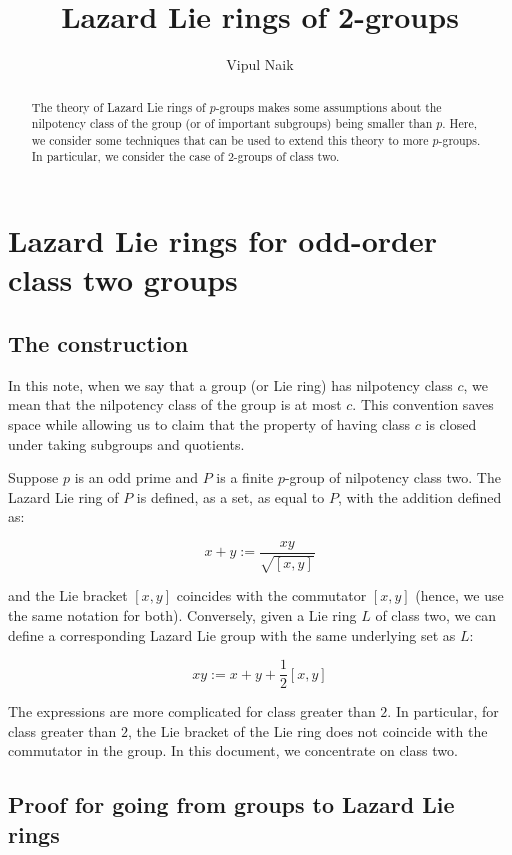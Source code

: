 \documentclass[10pt]{amsart}
\title{Lazard Lie rings of 2-groups}
\author{Vipul Naik}
\begin{document}
\maketitle

\begin{abstract}
  The theory of Lazard Lie rings of $p$-groups makes some assumptions
  about the nilpotency class of the group (or of important subgroups)
  being smaller than $p$. Here, we consider some techniques that can
  be used to extend this theory to more $p$-groups. In particular, we
  consider the case of $2$-groups of class two.
\end{abstract}

\section{Lazard Lie rings for odd-order class two groups}

\subsection{The construction}

In this note, when we say that a group (or Lie ring) has nilpotency
class $c$, we mean that the nilpotency class of the group is at most
$c$. This convention saves space while allowing us to claim that the
property of having class $c$ is closed under taking subgroups and
quotients.

Suppose $p$ is an odd prime and $P$ is a finite $p$-group of
nilpotency class two. The Lazard Lie ring of $P$ is defined, as a set,
as equal to $P$, with the addition defined as:

$$x + y := \frac{xy}{\sqrt{[x,y]}}$$

and the Lie bracket $[x,y]$ coincides with the commutator $[x,y]$
(hence, we use the same notation for both). Conversely, given a Lie
ring $L$ of class two, we can define a corresponding Lazard Lie group
with the same underlying set as $L$:

$$xy := x + y + \frac{1}{2}[x,y]$$

The expressions are more complicated for class greater than $2$. In
particular, for class greater than $2$, the Lie bracket of the Lie
ring does not coincide with the commutator in the group. In this
document, we concentrate on class two.

\subsection{Proof for going from groups to Lazard Lie rings}
\end{document}
